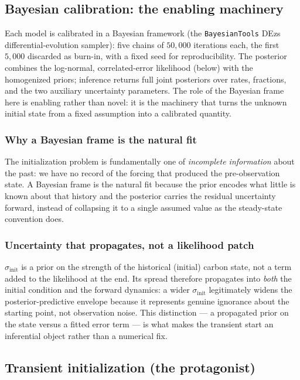 \documentclass[11pt]{article}
\begin{document}
\subsection{Bayesian calibration: the enabling machinery}
Each model is calibrated in a Bayesian framework (the \texttt{BayesianTools}
DEzs differential-evolution sampler): five chains of $50{,}000$ iterations each,
the first $5{,}000$ discarded as burn-in, with a fixed seed for
reproducibility. The posterior combines the log-normal, correlated-error likelihood
(below) with the homogenized priors; inference returns full joint posteriors
over rates, fractions, and the two auxiliary uncertainty parameters. The role of
the Bayesian frame here is enabling rather than novel: it is the machinery that
turns the unknown initial state from a fixed assumption into a calibrated
quantity.

\subsubsection{Why a Bayesian frame is the natural fit}
The initialization problem is fundamentally one of \emph{incomplete
information} about the past: we have no record of the forcing that produced the
pre-observation state. A Bayesian frame is the natural fit because the prior
encodes what little is known about that history and the posterior carries the
residual uncertainty forward, instead of collapsing it to a single assumed
value as the steady-state convention does.

\subsubsection{Uncertainty that propagates, not a likelihood patch}
$\sigma_{\mathrm{init}}$ is a prior on the strength of the historical (initial)
carbon state, not a term added to the likelihood at the end. Its spread
therefore propagates into \emph{both} the initial condition and the forward
dynamics: a wider $\sigma_{\mathrm{init}}$ legitimately widens the
posterior-predictive envelope because it represents genuine ignorance about the
starting point, not observation noise. This distinction --- a propagated prior
on the state versus a fitted error term --- is what makes the transient start an
inferential object rather than a numerical fix.

\subsection{Transient initialization (the protagonist)}
\end{document}
